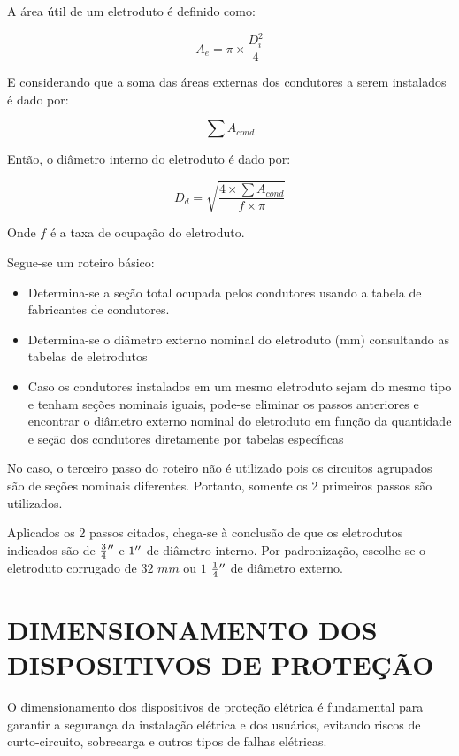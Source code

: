 A área útil de um eletroduto é definido como:

\begin{equation}
	A_e = \pi \times \frac{D_i^2}{4}
\end{equation}

E considerando que a soma das áreas externas dos condutores a serem instalados é dado por:

\begin{equation}
	\sum A_{cond}
\end{equation}

Então, o diâmetro interno do eletroduto é dado por:

\begin{equation}
	D_d = \sqrt{\frac{4 \times \sum A_{cond}}{f \times \pi}}
\end{equation}

Onde $f$ é a taxa de ocupação do eletroduto.

Segue-se um roteiro básico:

\begin{itemize}
	\item Determina-se a seção total ocupada pelos	condutores usando a tabela de fabricantes de condutores.
	\item Determina-se o diâmetro externo nominal do eletroduto
	(mm) consultando as	tabelas de eletrodutos
	\item Caso os condutores instalados em um mesmo	eletroduto sejam do mesmo tipo e tenham seções nominais iguais, pode-se eliminar os passos anteriores e encontrar o	diâmetro externo nominal	do eletroduto em função	da quantidade e seção dos condutores diretamente	por tabelas específicas
\end{itemize}

No caso, o terceiro passo do roteiro não é utilizado pois os circuitos agrupados são de seções nominais diferentes. Portanto, somente os 2 primeiros passos são utilizados.

Aplicados os 2 passos citados, chega-se à conclusão de que os eletrodutos indicados são de $\frac{3}{4}{}^{\prime\prime}$ e $1{}^{\prime\prime}$ de diâmetro interno. Por padronização, escolhe-se o eletroduto corrugado de $32$ $mm$ ou $1$ $\frac{1}{4}{}^{\prime\prime}$ de diâmetro externo.

\section{DIMENSIONAMENTO DOS DISPOSITIVOS DE PROTEÇÃO}

O dimensionamento dos dispositivos de proteção elétrica é fundamental para garantir a segurança da instalação elétrica e dos usuários, evitando riscos de curto-circuito, sobrecarga e outros tipos de falhas elétricas.


